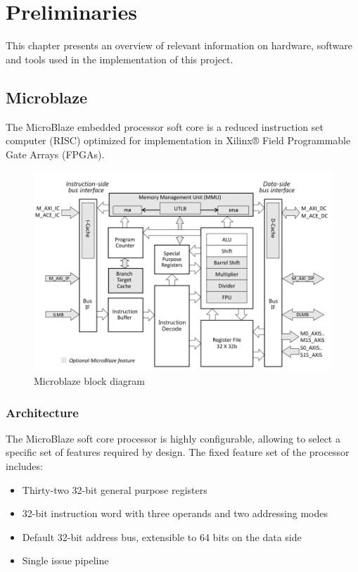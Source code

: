 \chapter{Preliminaries}

This chapter presents an overview of relevant information on hardware, software and tools used in the implementation of this project.  

\section{Microblaze}
The MicroBlaze embedded processor soft core is a reduced instruction set computer (RISC)
optimized for implementation in Xilinx® Field Programmable Gate Arrays (FPGAs). \cite{mb-reference}


\begin{figure}
	\centering
	\includegraphics[scale=0.5]{images/microblaze_block_diagram.png}
	\caption{Microblaze block diagram}
\end{figure}


\subsection{Architecture}

The MicroBlaze soft core processor is highly configurable, allowing to select a specific set of features required by design.
The fixed feature set of the processor includes:
\begin{itemize}
	\item Thirty-two 32-bit general purpose registers
	\item 32-bit instruction word with three operands and two addressing modes
	\item Default 32-bit address bus, extensible to 64 bits on the data side
	\item Single issue pipeline
\end{itemize}

